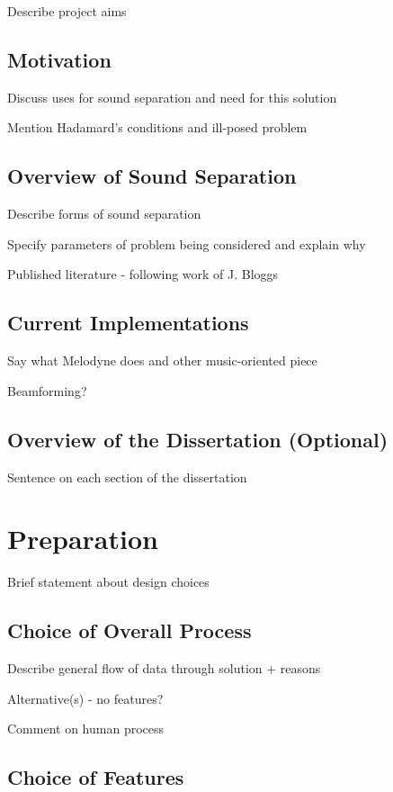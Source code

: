 \documentclass[10pt,twoside,a4paper]{report}
\begin{document}

Describe project aims

\section{Motivation}

Discuss uses for sound separation and need for this solution

Mention Hadamard's conditions and ill-posed problem

\section{Overview of Sound Separation}

Describe forms of sound separation

Specify parameters of problem being considered and explain why

Published literature - following work of J. Bloggs

\section{Current Implementations}

Say what Melodyne does and other music-oriented piece

Beamforming?

\section{Overview of the Dissertation (Optional)}

Sentence on each section of the dissertation

\chapter{Preparation}

Brief statement about design choices

\section{Choice of Overall Process}

Describe general flow of data through solution + reasons

Alternative(s) - no features?

Comment on human process

\section{Choice of Features}
\end{document}
